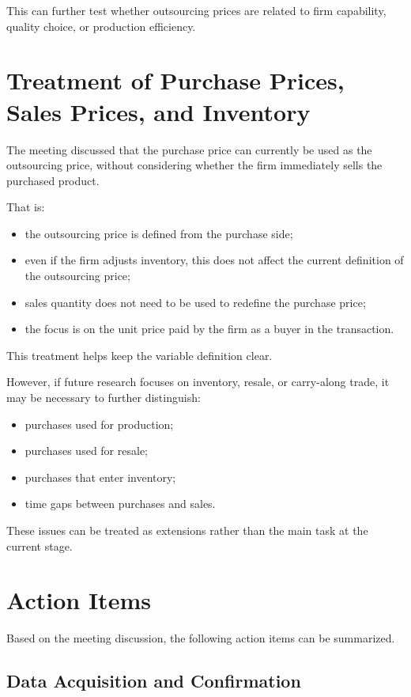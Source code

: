 \documentclass[11pt,a4paper]{article}
\begin{document}
This can further test whether outsourcing prices are related to firm capability, quality choice, or production efficiency.

\section{Treatment of Purchase Prices, Sales Prices, and Inventory}

The meeting discussed that the purchase price can currently be used as the outsourcing price, without considering whether the firm immediately sells the purchased product.

That is:

\begin{itemize}
    \item the outsourcing price is defined from the purchase side;
    \item even if the firm adjusts inventory, this does not affect the current definition of the outsourcing price;
    \item sales quantity does not need to be used to redefine the purchase price;
    \item the focus is on the unit price paid by the firm as a buyer in the transaction.
\end{itemize}

This treatment helps keep the variable definition clear.

However, if future research focuses on inventory, resale, or carry-along trade, it may be necessary to further distinguish:

\begin{itemize}
    \item purchases used for production;
    \item purchases used for resale;
    \item purchases that enter inventory;
    \item time gaps between purchases and sales.
\end{itemize}

These issues can be treated as extensions rather than the main task at the current stage.

\section{Action Items}

Based on the meeting discussion, the following action items can be summarized.

\subsection{Data Acquisition and Confirmation}
\end{document}
